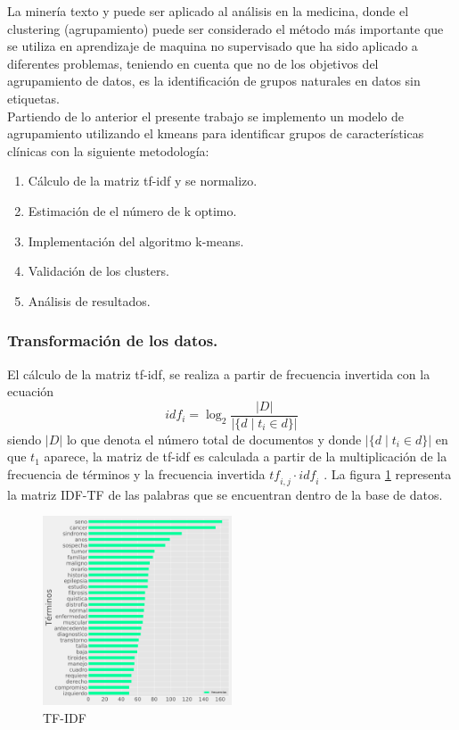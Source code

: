 La minería texto y puede ser aplicado al análisis en la medicina, donde el clustering (agrupamiento) puede ser considerado el método más importante que se utiliza en aprendizaje de maquina no supervisado que ha sido aplicado a diferentes problemas\cite{Kawashima2017}, teniendo en cuenta que no de los objetivos del agrupamiento de datos, es la  identificación de grupos naturales en datos sin etiquetas\cite{Jain2010}.\\

Partiendo de lo anterior el presente trabajo se implemento un modelo de agrupamiento utilizando el kmeans  para identificar grupos de características clínicas con la siguiente metodología:

\begin{enumerate}
	\item Cálculo de la matriz tf-idf y se normalizo. 
	\item Estimación de el número de k optimo.
	\item Implementación del algoritmo k-means.
	\item Validación de los clusters.
	\item Análisis de resultados. 	  
\end{enumerate}

\subsubsection{Transformación de los datos.}

El cálculo de la matriz tf-idf, se realiza a partir de frecuencia invertida con la ecuación 
$${idf}_i = \log_2 \frac{|D|}{|\{d \mid t_i \in d\}|}$$
siendo $|D|$ lo que denota el número total de documentos y donde $|\{d\mid t_i \in d\}|$ en  que $t_1$ aparece, la matriz de tf-idf es calculada a partir de la multiplicación de la frecuencia de términos y la frecuencia invertida $\mathit{tf}_{i,j} \cdot \mathit{idf}_i$ \cite{Buckley1988}. 
La figura \ref{fig:IDFTF} representa la matriz IDF-TF de las palabras que se encuentran dentro de la base de datos.  

\begin{figure}[H] 
	\centering
	\includegraphics[width=0.5\textwidth]{Kap4/tfidf.pdf}
	\caption{TF-IDF} 
	\label{fig:IDFTF}
\end{figure}

